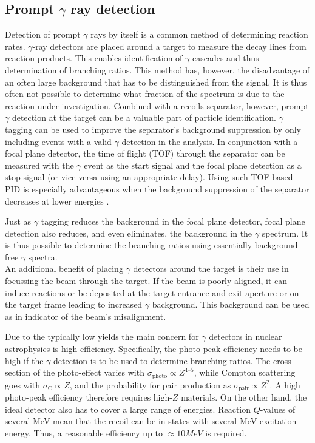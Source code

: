 \subsection{Prompt $\gamma$ ray detection}

Detection of prompt $\gamma$ rays by itself is a common method of determining reaction rates. $\gamma$-ray detectors are placed around a target to measure the decay lines from reaction products. This enables identification of $\gamma$ cascades and thus determination of branching ratios. This method has, however, the disadvantage of an often large background that has to be distinguished from the signal. It is thus often not possible to determine what fraction of the spectrum is due to the reaction under investigation. Combined with a recoils separator, however, prompt $\gamma$ detection at the target can be a valuable part of particle identification. $\gamma$ tagging can be used to improve the separator's background suppression by only including events with a valid $\gamma$ detection in the analysis. In conjunction with a focal plane detector, the time of flight (TOF) through the separator can be measured with the $\gamma$ event as the start signal and the focal plane detection as a stop signal (or vice versa using an appropriate delay). Using such TOF-based PID is especially advantageous when the background suppression of the separator decreases at lower energies \cite{hutc08}. 

Just as $\gamma$ tagging reduces the background in the focal plane detector, focal plane detection also reduces, and even eliminates, the background in the $\gamma$ spectrum. It is thus possible to determine the branching ratios using essentially background-free $\gamma$ spectra.\\
An additional benefit of placing $\gamma$ detectors around the target is their use in focussing the beam through the target. If the beam is poorly aligned, it can induce reactions or be deposited at the target entrance and exit aperture or on the target frame leading to increased $\gamma$ background. This background can be used as in indicator of the beam's misalignment.

Due to the typically low yields the main concern for $\gamma$ detectors in nuclear astrophysics is high efficiency. Specifically, the photo-peak efficiency needs to be high if the $\gamma$ detection is to be used to determine branching ratios. The cross section of the photo-effect varies with $\sigma_\mathrm{photo} \propto Z^{4\textrm{--}5}$, while Compton scattering goes with $\sigma_\mathrm{C} \propto Z$, and the probability for pair production as $\sigma_\mathrm{pair} \propto Z^2$. A high photo-peak efficiency therefore requires high-$Z$ materials. On the other hand, the ideal detector also has to cover a large range of energies. Reaction $Q$-values of several MeV mean that the recoil can be in states with several MeV excitation energy. Thus, a reasonable efficiency up to $\approx 10\unit{MeV}$ is required.

